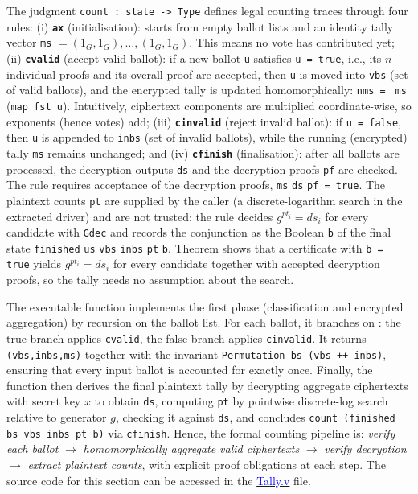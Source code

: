 \documentclass[sigconf,anonymous,review]{acmart}
\begin{document}
The judgment \texttt{count : state -> Type} defines legal counting traces through four rules: 
(i) \textbf{\texttt{ax}} (initialisation): starts from empty ballot lists and an identity tally vector \texttt{ms} $= (1_G,1_G),\ldots,(1_G,1_G)$. This means no vote has contributed yet; 
(ii) \textbf{\texttt{cvalid}} (accept valid ballot): if a new ballot \texttt{u} satisfies \texttt{} \texttt{u = true}, i.e., its $n$ individual proofs and its overall proof are accepted, then \texttt{u} is moved into \texttt{vbs} (set of valid ballots), and the encrypted tally is updated homomorphically: \texttt{nms = } \texttt{ms} (\texttt{map fst u}). Intuitively, ciphertext components are multiplied coordinate-wise, so exponents (hence votes) add; 
(iii) \textbf{\texttt{cinvalid}} (reject invalid ballot): if \texttt{} \texttt{u = false}, then \texttt{u} is appended to \texttt{inbs} (set of invalid ballots), while the running (encrypted) tally \texttt{ms} remains unchanged; and 
(iv) \textbf{\texttt{cfinish}} (finalisation): after all ballots are processed, the decryption outputs \texttt{ds} and the decryption proofs \texttt{pf} are checked. The rule requires acceptance of the decryption proofs, \texttt{} \texttt{ms} \texttt{ds} \texttt{pf = true}. The plaintext counts \texttt{pt} are supplied by the caller (a discrete-logarithm search in the extracted driver) and are not trusted: the rule decides $g^{pt_i}=ds_i$ for every candidate with \texttt{Gdec} and records the conjunction as the Boolean \texttt{b} of the final state \texttt{finished} \texttt{us} \texttt{vbs} \texttt{inbs} \texttt{pt} \texttt{b}. Theorem \texttt{} shows that a certificate with \texttt{b = true} yields $g^{pt_i}=ds_i$ for every candidate together with accepted decryption proofs, so the tally needs no assumption about the search.

The executable function \texttt{} implements the first phase (classification and encrypted aggregation) by recursion on the ballot list. For each ballot, it branches on \texttt{}: the true branch applies \texttt{cvalid}, the false branch applies \texttt{cinvalid}. It returns \texttt{(vbs,inbs,ms)} together with the invariant \texttt{Permutation bs (vbs ++ inbs)}, ensuring that every input ballot is accounted for exactly once. Finally, the function \texttt{} then derives the final plaintext tally by decrypting aggregate ciphertexts with secret key $x$ to obtain \texttt{ds}, computing \texttt{pt} by pointwise discrete-log search relative to generator $g$, checking it against \texttt{ds}, and concludes \texttt{count (finished bs vbs inbs pt b)} via \texttt{cfinish}. Hence, the formal counting pipeline is: \emph{verify each ballot} $\to$ \emph{homomorphically aggregate valid ciphertexts} $\to$ \emph{verify decryption} $\to$ \emph{extract plaintext counts}, with explicit proof obligations at each step. The source code for this section can be accessed in the \href{https://anonymous.4open.science/r/SigmaProtocol-EBA5/src/Backend/Tally.v}{\textcolor{blue}{Tally.v}} file.
\end{document}
